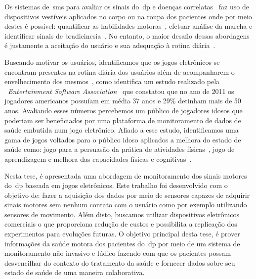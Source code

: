 Os sistemas de~\ac{sms} para avaliar os sinais do~\ac{dp} e doenças correlatas~\cite{mazilu2015} faz uso de dispositivos vestíveis aplicados no corpo ou na roupa dos pacientes onde por meio destes é possível: quantificar as habilidades motoras~\cite{manumeterjbhi2014,patel_monitoring_2009}, efetuar análise da marcha \cite{robotgait2014} e identificar sinais de bradicinesia~\cite{ambulatoryparkinson2010}. No entanto, o maior desafio dessas abordagens é justamente a aceitação do usuário e sua adequação à rotina diária~\cite{alemdar2015}. %

Buscando motivar os usuários, identificamos que os jogos eletrônicos se encontram presentes na rotina diária dos usuários além de acompanharem o envelhecimento dos mesmos~\cite{moore2011basics}, como identifica um estudo realizado pela ~\textit{Entertainment Software Association}~\cite{esa2011} que constatou que no ano de 2011 os jogadores americanos possuíam em média 37 anos e 29$\%$ detinham mais de 50 anos. Avaliando esses números percebemos um público de jogadores idosos que poderiam ser beneficiados por uma plataforma de monitoramento de dados de saúde embutida num jogo eletrônico. Aliado a esse estudo, identificamos uma  gama de jogos voltados para o público idoso aplicados a melhora do estado de saúde como: jogo para a persuasão da prática de atividades físicas~\cite{brox11}, jogo de aprendizagem e melhora das capacidades físicas e cognitivas~\cite{arntzen2011}. 

Nesta tese, é apresentada uma abordagem de monitoramento dos sinais motores do~\ac{dp} baseada em jogos eletrônicos. Este trabalho foi desenvolvido com o objetivo de: fazer a aquisição dos dados por meio de sensores capazes de adquirir sinais motores sem nenhum contato com o usuário como por exemplo utilizando sensores de movimento. Além disto, buscamos utilizar dispositivos eletrônicos comerciais o que proporciona redução de custos e possibilita a replicação dos experimentos para evoluções futuras. O objetivo principal desta tese, é prover informações da saúde motora dos pacientes do~\ac{dp} por meio de um sistema de monitoramento não invasivo e lúdico fazendo com que os pacientes possam desvencilhar do contexto do tratamento da saúde e fornecer dados sobre seu estado de saúde de uma maneira colaborativa.

